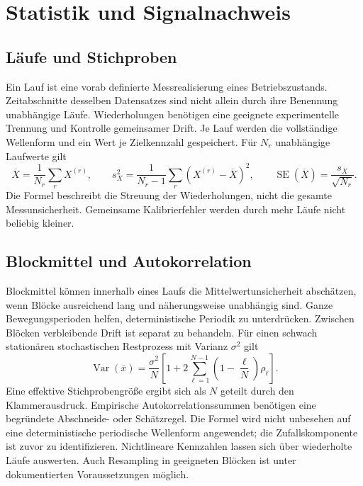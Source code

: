 \documentclass[11pt,a4paper]{article}
\newcommand{\Var}{\operatorname{Var}}
\newcommand{\SE}{\operatorname{SE}}
\begin{document}
\section{Statistik und Signalnachweis}\label{sec:statistik}
\subsection{Läufe und Stichproben}
Ein Lauf ist eine vorab definierte Messrealisierung eines Betriebszustands. Zeitabschnitte desselben Datensatzes sind nicht allein durch ihre Benennung unabhängige Läufe. Wiederholungen benötigen eine geeignete experimentelle Trennung und Kontrolle gemeinsamer Drift. Je Lauf werden die vollständige Wellenform und ein Wert je Zielkennzahl gespeichert.
Für $N_r$ unabhängige Laufwerte gilt
\begin{equation}
\overline X=\frac1{N_r}\sum_r X^{(r)},\qquad
s_X^2=\frac1{N_r-1}\sum_r(X^{(r)}-\overline X)^2,\qquad
\SE(\overline X)=\frac{s_X}{\sqrt{N_r}}.
\end{equation}
Die Formel beschreibt die Streuung der Wiederholungen, nicht die gesamte Messunsicherheit. Gemeinsame Kalibrierfehler werden durch mehr Läufe nicht beliebig kleiner.

\subsection{Blockmittel und Autokorrelation}
Blockmittel können innerhalb eines Laufs die Mittelwertunsicherheit abschätzen, wenn Blöcke ausreichend lang und näherungsweise unabhängig sind. Ganze Bewegungsperioden helfen, deterministische Periodik zu unterdrücken. Zwischen Blöcken verbleibende Drift ist separat zu behandeln.
Für einen schwach stationären stochastischen Restprozess mit Varianz $\sigma^2$ gilt
\begin{equation}
\Var(\overline x)=\frac{\sigma^2}{N}\left[1+2\sum_{\ell=1}^{N-1}\left(1-\frac\ell N\right)\rho_\ell\right].
\label{eq:acf}
\end{equation}
Eine effektive Stichprobengröße ergibt sich als $N$ geteilt durch den Klammerausdruck. Empirische Autokorrelationssummen benötigen eine begründete Abschneide- oder Schätzregel. Die Formel wird nicht unbesehen auf eine deterministische periodische Wellenform angewendet; die Zufallskomponente ist zuvor zu identifizieren. Nichtlineare Kennzahlen lassen sich über wiederholte Läufe auswerten. Auch Resampling in geeigneten Blöcken ist unter dokumentierten Voraussetzungen möglich.
\end{document}
